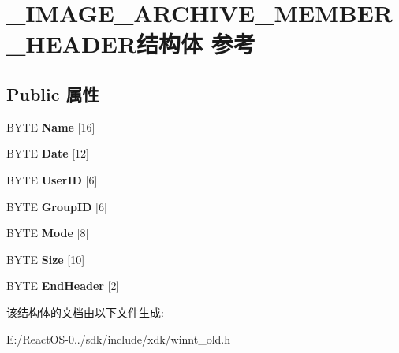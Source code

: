\hypertarget{struct___i_m_a_g_e___a_r_c_h_i_v_e___m_e_m_b_e_r___h_e_a_d_e_r}{}\section{\+\_\+\+I\+M\+A\+G\+E\+\_\+\+A\+R\+C\+H\+I\+V\+E\+\_\+\+M\+E\+M\+B\+E\+R\+\_\+\+H\+E\+A\+D\+E\+R结构体 参考}
\label{struct___i_m_a_g_e___a_r_c_h_i_v_e___m_e_m_b_e_r___h_e_a_d_e_r}
\subsection*{Public 属性}
\begin{DoxyCompactItemize}
\item 
\mbox{\label{struct___i_m_a_g_e___a_r_c_h_i_v_e___m_e_m_b_e_r___h_e_a_d_e_r_af1f075a9320ae9af1bad0bde6fbcc042}} 
B\+Y\+TE {\bfseries Name} \mbox{[}16\mbox{]}
\item 
\mbox{\label{struct___i_m_a_g_e___a_r_c_h_i_v_e___m_e_m_b_e_r___h_e_a_d_e_r_acd4f2079a43855ab434d4f5b38d9898c}} 
B\+Y\+TE {\bfseries Date} \mbox{[}12\mbox{]}
\item 
\mbox{\label{struct___i_m_a_g_e___a_r_c_h_i_v_e___m_e_m_b_e_r___h_e_a_d_e_r_a19615bc89c00e95f8cba297ffc4bc9c3}} 
B\+Y\+TE {\bfseries User\+ID} \mbox{[}6\mbox{]}
\item 
\mbox{\label{struct___i_m_a_g_e___a_r_c_h_i_v_e___m_e_m_b_e_r___h_e_a_d_e_r_a607503ca94d4be5875c2906c4c800024}} 
B\+Y\+TE {\bfseries Group\+ID} \mbox{[}6\mbox{]}
\item 
\mbox{\label{struct___i_m_a_g_e___a_r_c_h_i_v_e___m_e_m_b_e_r___h_e_a_d_e_r_a09f9fcec2dbec360c518e4cdb5a5e0fd}} 
B\+Y\+TE {\bfseries Mode} \mbox{[}8\mbox{]}
\item 
\mbox{\label{struct___i_m_a_g_e___a_r_c_h_i_v_e___m_e_m_b_e_r___h_e_a_d_e_r_a02c89830248fe6f81a14e8c8bc351146}} 
B\+Y\+TE {\bfseries Size} \mbox{[}10\mbox{]}
\item 
\mbox{\label{struct___i_m_a_g_e___a_r_c_h_i_v_e___m_e_m_b_e_r___h_e_a_d_e_r_a20bcf06706ccbb9c2664573d23bd8139}} 
B\+Y\+TE {\bfseries End\+Header} \mbox{[}2\mbox{]}
\end{DoxyCompactItemize}


该结构体的文档由以下文件生成\+:\begin{DoxyCompactItemize}
\item 
E\+:/\+React\+O\+S-\/0../sdk/include/xdk/winnt\+\_\+old.\+h\end{DoxyCompactItemize}
